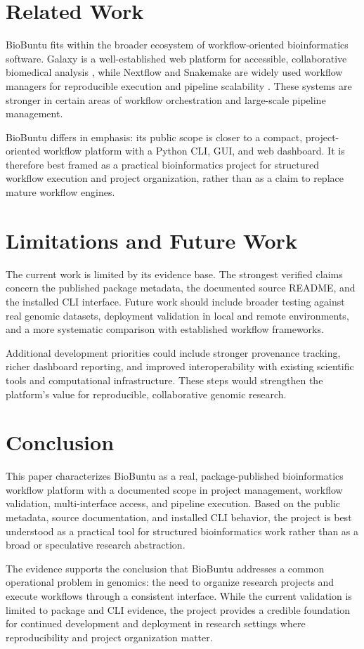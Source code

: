 \documentclass[10pt,conference]{IEEEtran}
\begin{document}
\section{Related Work}

BioBuntu fits within the broader ecosystem of workflow-oriented bioinformatics software. Galaxy is a well-established web platform for accessible, collaborative biomedical analysis \cite{afgan2016galaxy}, while Nextflow and Snakemake are widely used workflow managers for reproducible execution and pipeline scalability \cite{di2017nextflow, koster2012snakemake}. These systems are stronger in certain areas of workflow orchestration and large-scale pipeline management.

BioBuntu differs in emphasis: its public scope is closer to a compact, project-oriented workflow platform with a Python CLI, GUI, and web dashboard. It is therefore best framed as a practical bioinformatics project for structured workflow execution and project organization, rather than as a claim to replace mature workflow engines.

\section{Limitations and Future Work}

The current work is limited by its evidence base. The strongest verified claims concern the published package metadata, the documented source README, and the installed CLI interface. Future work should include broader testing against real genomic datasets, deployment validation in local and remote environments, and a more systematic comparison with established workflow frameworks.

Additional development priorities could include stronger provenance tracking, richer dashboard reporting, and improved interoperability with existing scientific tools and computational infrastructure. These steps would strengthen the platform’s value for reproducible, collaborative genomic research.

\section{Conclusion}

This paper characterizes BioBuntu as a real, package-published bioinformatics workflow platform with a documented scope in project management, workflow validation, multi-interface access, and pipeline execution. Based on the public metadata, source documentation, and installed CLI behavior, the project is best understood as a practical tool for structured bioinformatics work rather than as a broad or speculative research abstraction.

The evidence supports the conclusion that BioBuntu addresses a common operational problem in genomics: the need to organize research projects and execute workflows through a consistent interface. While the current validation is limited to package and CLI evidence, the project provides a credible foundation for continued development and deployment in research settings where reproducibility and project organization matter.



\end{document}
